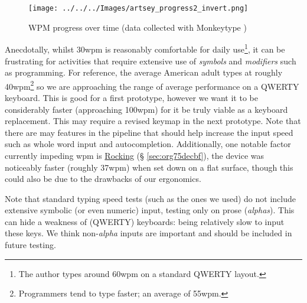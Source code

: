 \documentclass[logo,bsc,singlespacing,parskip]{infthesis}
\begin{document}
\begin{figure}[h]
\centering
\texttt{[image: ../../../Images/artsey\_progress2\_invert.png]}
\caption[WPM progress over time]{\label{fig:wpm}WPM progress over time (data collected with Monkeytype \autocite{miodecMonkeytype})}
\end{figure}

Anecdotally, whilst 30wpm is reasonably comfortable for daily use\footnote{The author types around 60wpm on a standard QWERTY layout.}, it can be frustrating for activities that require extensive use of \emph{symbols} and \emph{modifiers} such as programming.
For reference, the average American adult types at roughly 40wpm\footnote{Programmers tend to type faster; an average of 55wpm.} \autocite{WhatAverageTyping} so we are approaching the range of average performance on a QWERTY keyboard.
This is good for a first prototype, however we want it to be considerably faster (approaching 100wpm) for it be truly viable as a keyboard replacement.
This may require a revised keymap in the next prototype.
Note that there are may features in the pipeline that should help increase the input speed such as whole word input and autocompletion.
Additionally, one notable factor currently impeding wpm is
\hyperref[sec:org75decbf]{Rocking} (§ \ref{sec:org75decbf}),  the device was noticeably faster (roughly 37wpm) when set down on a flat surface, though this could also be due to the drawbacks of our ergonomics. \medskip

Note that standard typing speed tests (such as the ones we used) do not include extensive symbolic (or even numeric) input, testing only on prose (\emph{alphas}). This can hide a weakness of (QWERTY) keyboards: being relatively slow to input these keys. We think non-\emph{alpha} inputs are important and should be included in future testing.
\end{document}
